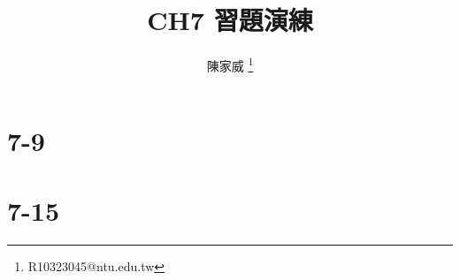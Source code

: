 \documentclass[ mathserif]{beamer}
\title{CH7 習題演練}
\author{陳家威 \thanks{R10323045@ntu.edu.tw}}
\begin{document}
    \begin{frame}    
        \maketitle
    \end{frame}

    \section{7-9}
    

    \section{7-15}
    
\end{document}
